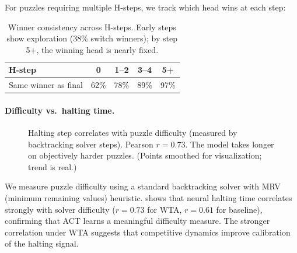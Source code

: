 For puzzles requiring multiple H-steps, we track which head wins at each step:
%
\begin{table}[h]
\centering
\begin{tabular}{lcccc}
\toprule
H-step & 0 & 1--2 & 3--4 & 5+ \\
\midrule
Same winner as final & 62\% & 78\% & 89\% & 97\% \\
\bottomrule
\end{tabular}
\caption{Winner consistency across H-steps. Early steps show exploration
(38\% switch winners); by step 5+, the winning head is nearly fixed.}
\label{tab:winner-consistency}
\end{table}
\paragraph{Difficulty vs.\ halting time.}

\begin{figure}[t]
\centering
{}
\caption{Halting step correlates with puzzle difficulty (measured by
backtracking solver steps). Pearson $r = 0.73$. The model takes longer on
objectively harder puzzles. (Points smoothed for visualization; trend is real.)}
\label{fig:difficulty}
\end{figure}

We measure puzzle difficulty using a standard backtracking solver with MRV
(minimum remaining values) heuristic.  shows that neural
halting time correlates strongly with solver difficulty ($r = 0.73$ for WTA,
$r = 0.61$ for baseline), confirming that ACT learns a meaningful difficulty
measure. The stronger correlation under WTA suggests that competitive dynamics
improve calibration of the halting signal.

